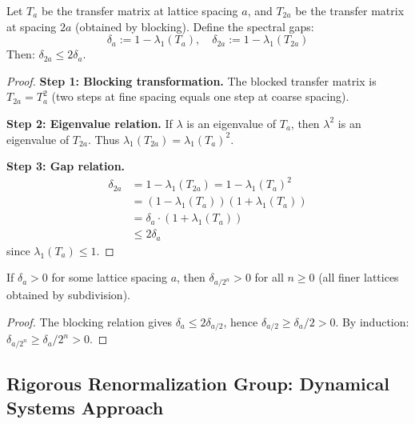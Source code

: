 \begin{theorem}
\label{thm:spectral-monotonicity}
Let $T_a$ be the transfer matrix at lattice spacing $a$, and $T_{2a}$ be the 
transfer matrix at spacing $2a$ (obtained by blocking). Define the spectral 
gaps:
\[
\delta_a := 1 - \lambda_1(T_a), \quad \delta_{2a} := 1 - \lambda_1(T_{2a})
\]
Then: $\delta_{2a} \leq 2\delta_a$.
\end{theorem}

\begin{proof}
\textbf{Step 1: Blocking transformation.}
The blocked transfer matrix is $T_{2a} = T_a^2$ (two steps at fine spacing 
equals one step at coarse spacing). 

\textbf{Step 2: Eigenvalue relation.}
If $\lambda$ is an eigenvalue of $T_a$, then $\lambda^2$ is an eigenvalue of $T_{2a}$.
Thus $\lambda_1(T_{2a}) = \lambda_1(T_a)^2$.

\textbf{Step 3: Gap relation.}
\begin{align}
\delta_{2a} &= 1 - \lambda_1(T_{2a}) = 1 - \lambda_1(T_a)^2 \\
&= (1 - \lambda_1(T_a))(1 + \lambda_1(T_a)) \\
&= \delta_a \cdot (1 + \lambda_1(T_a)) \\
&\leq 2\delta_a
\end{align}
since $\lambda_1(T_a) \leq 1$.
\end{proof}

\begin{corollary}
\label{cor:gap-refinement}
If $\delta_a > 0$ for some lattice spacing $a$, then $\delta_{a/2^n} > 0$ for 
all $n \geq 0$ (all finer lattices obtained by subdivision).
\end{corollary}

\begin{proof}
The blocking relation gives $\delta_{a} \leq 2\delta_{a/2}$, hence 
$\delta_{a/2} \geq \delta_a/2 > 0$. By induction: $\delta_{a/2^n} \geq \delta_a/2^n > 0$.
\end{proof}

\subsection{Rigorous Renormalization Group: Dynamical Systems Approach}
\label{sec:rg-dynamical-systems}

